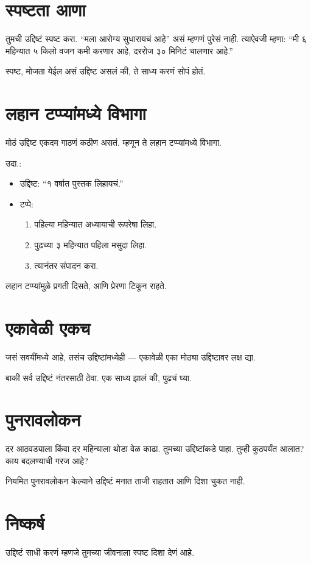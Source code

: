 \section*{स्पष्टता आणा}
तुमची उद्दिष्टं स्पष्ट करा.  
“मला आरोग्य सुधारायचं आहे” असं म्हणणं पुरेसं नाही.  
त्याऐवजी म्हणा:  
“मी ६ महिन्यात ५ किलो वजन कमी करणार आहे,  
दररोज ३० मिनिटं चालणार आहे.”  

स्पष्ट, मोजता येईल असं उद्दिष्ट असलं की,  
ते साध्य करणं सोपं होतं.  

\section*{लहान टप्प्यांमध्ये विभागा}
मोठं उद्दिष्ट एकदम गाठणं कठीण असतं.  
म्हणून ते लहान टप्प्यांमध्ये विभागा.  

उदा.:  
\begin{itemize}
\item उद्दिष्ट: “१ वर्षात पुस्तक लिहायचं.”  
\item टप्पे:  
\begin{enumerate}
\item पहिल्या महिन्यात अध्यायाची रूपरेषा लिहा.  
\item पुढच्या ३ महिन्यात पहिला मसुदा लिहा.  
\item त्यानंतर संपादन करा.  
\end{enumerate}
\end{itemize}

लहान टप्प्यांमुळे प्रगती दिसते,  
आणि प्रेरणा टिकून राहते.  

\section*{एकावेळी एकच}
जसं सवयींमध्ये आहे,  
तसंच उद्दिष्टांमध्येही —  
एकावेळी एका मोठ्या उद्दिष्टावर लक्ष द्या.  

बाकी सर्व उद्दिष्टं नंतरसाठी ठेवा.  
एक साध्य झालं की, पुढचं घ्या.  

\section*{पुनरावलोकन}
दर आठवड्याला किंवा दर महिन्याला थोडा वेळ काढा.  
तुमच्या उद्दिष्टांकडे पाहा.  
तुम्ही कुठपर्यंत आलात?  
काय बदलण्याची गरज आहे?  

नियमित पुनरावलोकन केल्याने  
उद्दिष्टं मनात ताजी राहतात  
आणि दिशा चुकत नाही.  

\section*{निष्कर्ष}
उद्दिष्टं साधी करणं म्हणजे  
तुमच्या जीवनाला स्पष्ट दिशा देणं आहे.  


